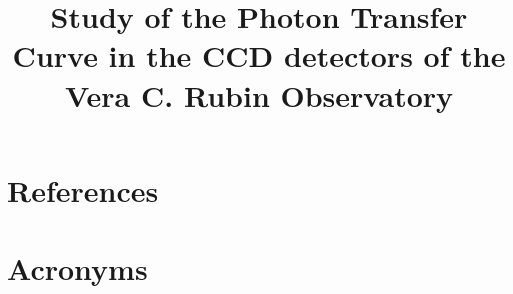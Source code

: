 \documentclass[OPS,authoryear,toc]{lsstdoc}
\title{Study of the Photon Transfer Curve in the CCD detectors of the Vera C. Rubin Observatory}
\date{\vcsDate}
\begin{document}
\maketitle










\appendix
\section{References} \label{sec:bib}
\renewcommand{\refname}{} %


\section{Acronyms} \label{sec:acronyms}

\end{document}
